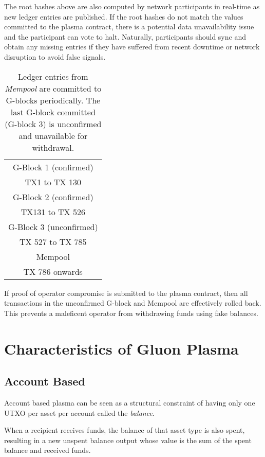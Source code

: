 \documentclass[12pt,a4paper]{article}
\begin{document}
The root hashes above are also computed by network participants in real-time as new ledger entries are published. If the root hashes do not match the values committed to the plasma contract, there is a potential data unavailability issue and the participant can vote to halt. Naturally, participants should sync and obtain any missing entries if they have suffered from recent downtime or network disruption to avoid false signals.

\begin{table}[ht]
\caption{Ledger entries from \emph{Mempool} are committed to G-blocks periodically. The last G-block committed (G-block 3) is unconfirmed and unavailable for withdrawal.}
\centering
\begin{tabular}{|c|}
\hline
\rowcolor{green!50}G-Block 1 (confirmed) \\
\rowcolor{green!30}TX1 to TX 130 \\
\hline
\rowcolor{green!50}G-Block 2 (confirmed) \\
\rowcolor{green!30}TX131 to TX 526 \\
\hline
\rowcolor{orange!50}G-Block 3 (unconfirmed) \\
\rowcolor{orange!30}TX 527 to TX 785 \\
\hline
Mempool \\
TX 786 onwards \\
\hline
\end{tabular}
\end{table}

If proof of operator compromise is submitted to the plasma contract, then all transactions in the unconfirmed G-block and Mempool are effectively rolled back. This prevents a maleficent operator from withdrawing funds using fake balances.

\section{Characteristics of Gluon Plasma}
\subsection{Account Based}
Account based plasma can be seen as a structural constraint of having only one UTXO per asset per account called the \emph{balance}. 

When a recipient receives funds, the balance of that asset type is also spent, resulting in a new unspent balance output whose value is the sum of the spent balance and received funds.
\end{document}

